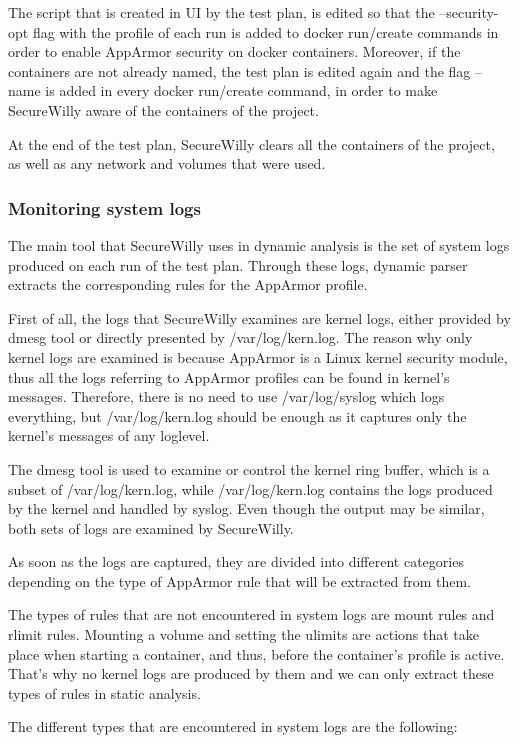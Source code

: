 The script that is created in UI by the test plan, is edited so that the --security-opt flag with the profile of each run is added to docker run/create commands in order to enable AppArmor security on docker containers. Moreover, if the containers are not already named, the test plan is edited again and the flag --name is added in every docker run/create command, in order to make SecureWilly aware of the containers of the project.

At the end of the test plan, SecureWilly clears all the containers of the project, as well as any network and volumes that were used.

\subsubsection{Monitoring system logs}
The main tool that SecureWilly uses in dynamic analysis is the set of system logs produced on each run of the test plan. Through these logs, dynamic parser extracts the corresponding rules for the AppArmor profile.

First of all, the logs that SecureWilly examines are kernel logs, either provided by dmesg tool or directly presented by /var/log/kern.log. The reason why only kernel logs are examined is because AppArmor is a Linux kernel security module, thus all the logs referring to AppArmor profiles can be found in kernel's messages. Therefore, there is no need to use /var/log/syslog which logs everything, but /var/log/kern.log should be enough as it captures only the kernel's messages of any loglevel. 

The dmesg tool is used to examine or control the kernel ring buffer, which is a subset of /var/log/kern.log, while /var/log/kern.log contains the logs produced by the kernel and handled by syslog. Even though the output may be similar, both sets of logs are examined by SecureWilly.

As soon as the logs are captured, they are divided into different categories depending on the type of AppArmor rule that will be extracted from them.

The types of rules that are not encountered in system logs are mount rules and rlimit rules.  Mounting a volume and setting the ulimits are actions that take place when starting a container, and thus, before the container's profile is active. That's why no kernel logs are produced by them and we can only extract these types of rules in static analysis.

The different types that are encountered in system logs are the following:

